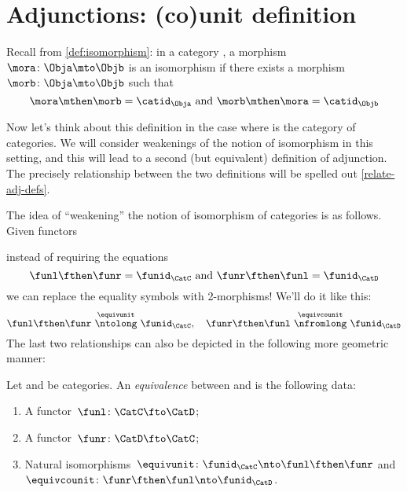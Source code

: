 
\section{Adjunctions: (co)unit definition}

Recall from \cref{def:isomorphism}: in a category \CatC, a morphism~$\mora \colon \Obja \mto \Objb$ is an isomorphism if there exists a morphism~$\morb \colon \Obja \mto \Objb$ such that
\begin{equation*}
    \mora \mthen \morb = \catid_\Obja \text{ and } \morb \mthen \mora = \catid_\Objb
\end{equation*}

Now let's think about this definition in the case where \CatC is the category \Category of categories.
We will consider weakenings of the notion of isomorphism in this setting, and this will lead to a second (but equivalent) definition of adjunction.
The precisely relationship between the two definitions will be spelled out \cref{relate-adj-defs}.

The idea of ``weakening'' the notion of isomorphism of categories is as follows.
Given functors
\begin{center}
\end{center}
%
instead of requiring the equations
%
\begin{equation*}
    \funl \fthen \funr = \funid_\CatC  \text{ and } \funr \fthen \funl = \funid_\CatD
\end{equation*}
%
we can replace the equality symbols with 2-morphisms!
We'll do it like this:
%
\begin{equation*}
    \funl \fthen \funr \ \overset{\equivunit}{\ntolong}\  \funid_\CatC, \quad  \funr \fthen \funl \ \overset{\equivcounit}{\nfromlong}\  \funid_\CatD
\end{equation*}
The last two relationships can also be depicted in the following more geometric manner:
\begin{center}
    \hspace{1cm}
\end{center}

\begin{ctdefinition}
    \label{def:cat-equivalence}
    Let \CatC and \CatD be categories.
    An \emph{equivalence} between \CatC and \CatD is the following data:
    \begin{enumerate}
        \item A functor~$\funl \colon \CatC \fto \CatD$;
        \item A functor~$\funr \colon \CatD \fto \CatC$;
        \item Natural isomorphisms~$\equivunit \colon \funid_\CatC \nto \funl \fthen \funr$ and~$\equivcounit \colon  \funr \fthen \funl \nto \funid_\CatD$.
    \end{enumerate}
\end{ctdefinition}

